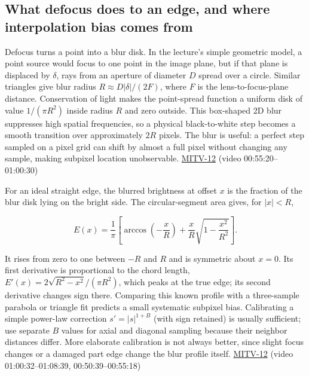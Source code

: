 \subsection{What defocus does to an edge, and where interpolation bias comes from}\label{04-visual-computing-ii-ch030-what-defocus-does-to-an-edge-and-where-interpolation-bias-comes-from}

Defocus turns a point into a blur disk. In the lecture's simple geometric model, a point source would focus to one point in the image plane, but if that plane is displaced by \(\delta\), rays from an aperture of diameter \(D\) spread over a circle. Similar triangles give blur radius \(R\approx D|\delta|/(2F)\), where \(F\) is the lens-to-focus-plane distance. Conservation of light makes the point-spread function a uniform disk of value \(1/(\pi R^2)\) inside radius \(R\) and zero outside. This box-shaped 2D blur suppresses high spatial frequencies, so a physical black-to-white step becomes a smooth transition over approximately \(2R\) pixels. The blur is useful: a perfect step sampled on a pixel grid can shift by almost a full pixel without changing any sample, making subpixel location unobservable. \hyperref[04-visual-computing-ii-ch036-mitv-12---blob-analysis-binary-image-processing-greens-theorem-derivative-and-integral]{MITV-12} (video 00:55:20--01:00:30)

For an ideal straight edge, the blurred brightness at offset \(x\) is the fraction of the blur disk lying on the bright side. The circular-segment area gives, for \(|x|<R\),

\[
E(x)=\frac{1}{\pi}\left[\arccos\left(-\frac{x}{R}\right)+\frac{x}{R}\sqrt{1-\frac{x^2}{R^2}}\right].
\]

It rises from zero to one between \(-R\) and \(R\) and is symmetric about \(x=0\). Its first derivative is proportional to the chord length, \(E'(x)=2\sqrt{R^2-x^2}/(\pi R^2)\), which peaks at the true edge; its second derivative changes sign there. Comparing this known profile with a three-sample parabola or triangle fit predicts a small systematic subpixel bias. Calibrating a simple power-law correction \(s'=|s|^{1+B}\) (with sign retained) is usually sufficient; use separate \(B\) values for axial and diagonal sampling because their neighbor distances differ. More elaborate calibration is not always better, since slight focus changes or a damaged part edge change the blur profile itself. \hyperref[04-visual-computing-ii-ch036-mitv-12---blob-analysis-binary-image-processing-greens-theorem-derivative-and-integral]{MITV-12} (video 01:00:32--01:08:39, 00:50:39--00:55:18)

